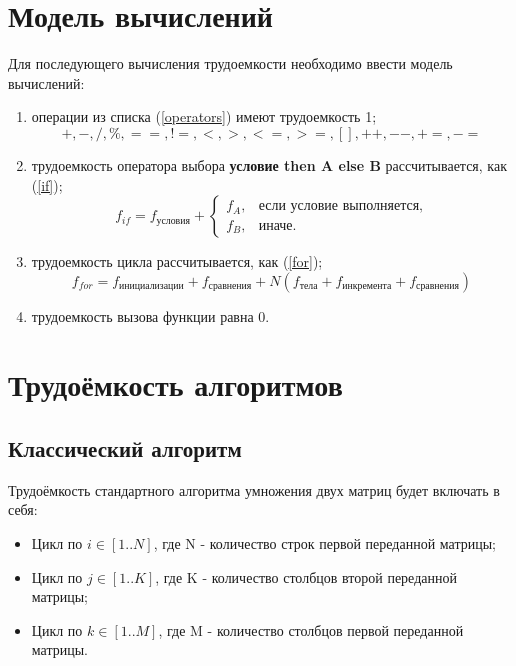 \documentclass[12pt]{report}
\begin{document}
\newpage
\section{Модель вычислений}

Для последующего вычисления трудоемкости необходимо ввести модель вычислений:
\begin{enumerate}
    \item операции из списка (\ref{operators}) имеют трудоемкость 1;
        \begin{equation}
            \label{operators}
            +, -, /, \%, ==, !=, <, >, <=, >=, [], ++, {-}-, +=, -=
        \end{equation}
    \item трудоемкость оператора выбора \textbf{условие then A else B} рассчитывается, как (\ref{if});
	\begin{equation}
        \label{if}
        f_{if} = f_{\text{условия}} +
        \begin{cases}
        f_A, & \text{если условие выполняется,}\\
        f_B, & \text{иначе.}
        \end{cases}
	\end{equation}
\item трудоемкость цикла рассчитывается, как (\ref{for});
    \begin{equation}
        \label{for:for}
        f_{for} = f_{\text{инициализации}} + f_{\text{сравнения}} + N(f_{\text{тела}} + f_{\text{инкремента}} + f_{\text{сравнения}})
    \end{equation}
	\item трудоемкость вызова функции равна 0.
\end{enumerate}

\section{Трудоёмкость алгоритмов}
\subsection{Классический алгоритм}
Трудоёмкость стандартного алгоритма умножения двух матриц будет включать в себя:
\begin{itemize}
\item Цикл по $i \in [1..N]$, где N - количество строк первой переданной матрицы;
\item Цикл по $j \in [1..K]$, где K - количество столбцов второй переданной матрицы;
\item Цикл по $k \in [1..M]$, где M - количество столбцов первой переданной матрицы.
\end{itemize}
\end{document}
